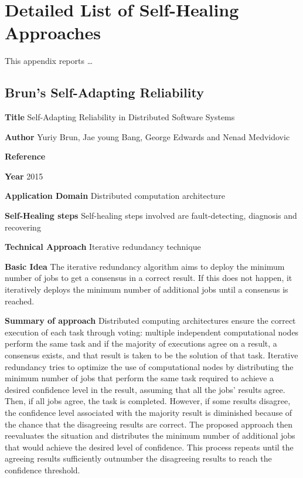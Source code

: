 \appendix
\chapter{Detailed List of Self-Healing Approaches}
\label{ap:approches}

This appendix reports \ldots 

\section{Brun's Self-Adapting Reliability} \label{ap:BurnSelf}
\begin{compactitem}
\item[\textbf{Title}]Self-Adapting Reliability in Distributed Software Systems
\item[\textbf{Author}] 
Yuriy Brun, Jae young Bang, George Edwards and Nenad Medvidovic
\item[\textbf{Reference}] 
\cite{brun_self-adapting_2015}
\item[\textbf{Year}] 
2015
\item[\textbf{Application Domain}] 
Distributed computation architecture
\item[\textbf{Self-Healing steps}] Self-healing steps involved are fault-detecting, diagnosis and recovering
\item[\textbf{Technical Approach}]Iterative redundancy technique
\item[\textbf{Basic Idea}] 
The iterative redundancy algorithm aims to deploy the minimum number of jobs to get a consensus in a correct result. If this does not happen, it iteratively deploys the minimum number of additional jobs until a consensus is reached. 

\item[\textbf{Summary of approach}]
Distributed computing architectures ensure the correct execution of each task through voting: multiple independent computational nodes perform the same task and if the majority of executions agree on a result, a consensus exists, and that result is taken to be the solution of that task. Iterative redundancy tries to optimize the use of computational nodes by distributing the minimum number of jobs that perform the same task required to achieve a desired confidence level in the result, assuming that all the jobs’ results agree. Then, if all jobs agree, the task is completed. However, if some results disagree, the confidence level associated with the majority result is diminished because of the chance that the disagreeing results are correct. The proposed approach then reevaluates the situation and distributes the minimum number of additional jobs that would achieve the desired level of confidence.
This process repeats until the agreeing results sufficiently outnumber the disagreeing results to reach the confidence threshold.



\end{compactitem}
